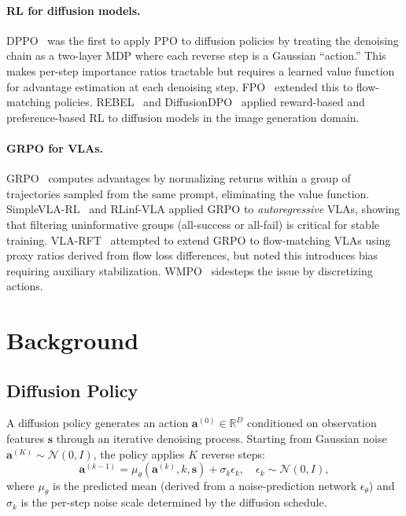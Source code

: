 \documentclass{article}
\newcommand{\R}{\mathbb{R}}
\newcommand{\ba}{\mathbf{a}}
\newcommand{\bs}{\mathbf{s}}
\begin{document}
\paragraph{RL for diffusion models.}
DPPO~\cite{ren2024dppo} was the first to apply PPO to diffusion policies by treating the denoising chain as a two-layer MDP where each reverse step is a Gaussian ``action.''
This makes per-step importance ratios tractable but requires a learned value function for advantage estimation at each denoising step.
FPO~\cite{fpo2025} extended this to flow-matching policies.
REBEL~\cite{rebel2024} and DiffusionDPO~\cite{wallace2023diffusiondpo} applied reward-based and preference-based RL to diffusion models in the image generation domain.

\paragraph{GRPO for VLAs.}
GRPO~\cite{shao2024deepseekmath} computes advantages by normalizing returns within a group of trajectories sampled from the same prompt, eliminating the value function.
SimpleVLA-RL~\cite{wu2025simplevlarl} and RLinf-VLA applied GRPO to \emph{autoregressive} VLAs, showing that filtering uninformative groups (all-success or all-fail) is critical for stable training.
VLA-RFT~\cite{zhai2024vlarft} attempted to extend GRPO to flow-matching VLAs using proxy ratios derived from flow loss differences, but noted this introduces bias requiring auxiliary stabilization.
WMPO~\cite{wang2025wmpo} sidesteps the issue by discretizing actions.


\section{Background}
\label{sec:background}

\subsection{Diffusion Policy}

A diffusion policy generates an action $\ba^{(0)} \in \R^D$ conditioned on observation features $\bs$ through an iterative denoising process.
Starting from Gaussian noise $\ba^{(K)} \sim \mathcal{N}(0, I)$, the policy applies $K$ reverse steps:
\begin{equation}
\ba^{(k-1)} = \mu_\theta(\ba^{(k)}, k, \bs) + \sigma_k \epsilon_k, \quad \epsilon_k \sim \mathcal{N}(0, I),
\end{equation}
where $\mu_\theta$ is the predicted mean (derived from a noise-prediction network $\epsilon_\theta$) and $\sigma_k$ is the per-step noise scale determined by the diffusion schedule.
\end{document}
